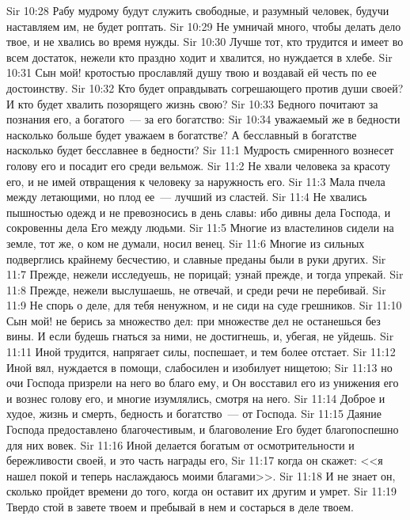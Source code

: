 \vs Sir 10:28 Рабу мудрому будут служить свободные, и разумный человек, будучи наставляем им, не будет роптать.
\vs Sir 10:29 Не умничай много, чтобы делать дело твое, и не хвались во время нужды.
\vs Sir 10:30 Лучше тот, кто трудится и имеет во всем достаток, нежели кто праздно ходит и хвалится, но нуждается в хлебе.
\vs Sir 10:31 Сын мой! кротостью прославляй душу твою и воздавай ей честь по ее достоинству.
\vs Sir 10:32 Кто будет оправдывать согрешающего против души своей? И кто будет хвалить позорящего жизнь свою?
\vs Sir 10:33 Бедного почитают за познания его, а богатого~--- за его богатство:
\vs Sir 10:34 уважаемый же в бедности насколько больше будет уважаем в богатстве? А бесславный в богатстве насколько будет бесславнее в бедности?
\vs Sir 11:1 Мудрость смиренного вознесет голову его и посадит его среди вельмож.
\vs Sir 11:2 Не хвали человека за красоту его, и не имей отвращения к человеку за наружность его.
\vs Sir 11:3 Мала пчела между летающими, но плод ее~--- лучший из сластей.
\vs Sir 11:4 Не хвались пышностью одежд и не превозносись в день славы: ибо дивны дела Господа, и сокровенны дела Его между людьми.
\vs Sir 11:5 Многие из властелинов сидели на земле, тот же, о ком не думали, носил венец.
\vs Sir 11:6 Многие из сильных подверглись крайнему бесчестию, и славные преданы были в руки других.
\vs Sir 11:7 Прежде, нежели исследуешь, не порицай; узнай прежде, и тогда упрекай.
\vs Sir 11:8 Прежде, нежели выслушаешь, не отвечай, и среди речи не перебивай.
\vs Sir 11:9 Не спорь о деле, для тебя ненужном, и не сиди на суде грешников.
\rsbpar\vs Sir 11:10 Сын мой! не берись за множество дел: при множестве дел не останешься без вины. И если будешь гнаться за ними, не достигнешь, и, убегая, не уйдешь.
\vs Sir 11:11 Иной трудится, напрягает силы, поспешает, и тем более отстает.
\vs Sir 11:12 Иной вял, нуждается в помощи, слабосилен и изобилует нищетою;
\vs Sir 11:13 но очи Господа призрели на него во благо ему, и Он восставил его из унижения его и вознес голову его, и многие изумлялись, смотря на него.
\vs Sir 11:14 Доброе и худое, жизнь и смерть, бедность и богатство~--- от Господа.
\vs Sir 11:15 Даяние Господа предоставлено благочестивым, и благоволение Его будет благопоспешно для них вовек.
\vs Sir 11:16 Иной делается богатым от осмотрительности и бережливости своей, и это часть награды его,
\vs Sir 11:17 когда он скажет: <<я нашел покой и теперь наслаждаюсь моими благами>>.
\vs Sir 11:18 И не знает он, сколько пройдет времени до того, когда он оставит их другим и умрет.
\vs Sir 11:19 Твердо стой в завете твоем и пребывай в нем и состарься в деле твоем.
